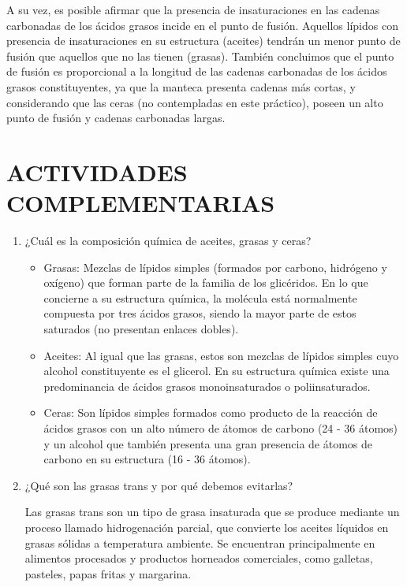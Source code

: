 \documentclass{article}
\begin{document}
A su vez, es posible afirmar que la presencia de insaturaciones en las cadenas carbonadas de los ácidos grasos incide en el punto de fusión. Aquellos lípidos con presencia de insaturaciones en su estructura (aceites) tendrán un menor punto de fusión que aquellos que no las tienen (grasas). También concluimos que el punto de fusión es proporcional a la longitud de las cadenas carbonadas de los ácidos grasos constituyentes, ya que la manteca presenta cadenas más cortas, y considerando que las ceras (no contempladas en este práctico), poseen un alto punto de fusión y cadenas carbonadas largas.

\section{ACTIVIDADES COMPLEMENTARIAS}
\begin{enumerate}
    \item ¿Cuál es la composición química de aceites, grasas y ceras?

    \begin{itemize}
        \item Grasas: Mezclas de lípidos simples (formados por carbono, hidrógeno y oxígeno) que forman parte de la familia de los glicéridos. En lo que concierne a su estructura química, la molécula está normalmente compuesta por tres ácidos grasos, siendo la mayor parte de estos saturados (no presentan enlaces dobles).
        
        \item Aceites: Al igual que las grasas, estos son mezclas de lípidos simples cuyo alcohol constituyente es el glicerol. En su estructura química existe una predominancia de ácidos grasos monoinsaturados o poliinsaturados.

        \item Ceras: Son lípidos simples formados como producto de la reacción de ácidos grasos con un alto número de átomos de carbono (24 - 36 átomos) y un alcohol que también presenta una gran presencia de átomos de carbono en su estructura (16 - 36 átomos).
    \end{itemize}
    
    \item ¿Qué son las grasas trans y por qué debemos evitarlas?

    Las grasas trans son un tipo de grasa insaturada que se produce mediante un proceso llamado hidrogenación parcial, que convierte los aceites líquidos en grasas sólidas a temperatura ambiente. Se encuentran principalmente en alimentos procesados y productos horneados comerciales, como galletas, pasteles, papas fritas y margarina.
    

\end{enumerate}
\end{document}
